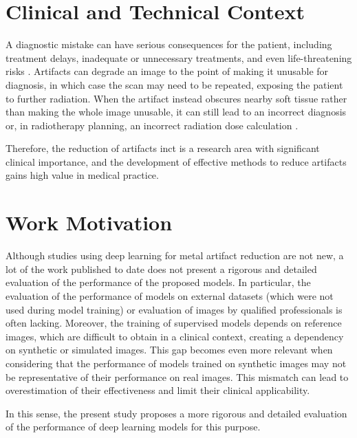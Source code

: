 \section{Clinical and Technical Context}

A diagnostic mistake can have serious consequences for the patient, including treatment delays, inadequate or unnecessary treatments, and even life-threatening risks \cite{alkhodariEnhancingCCTAImage2025}. Artifacts can degrade an image to the point of making it unusable for diagnosis, in which case the scan may need to be repeated, exposing the patient to further radiation. When the artifact instead obscures nearby soft tissue rather than making the whole image unusable, it can still lead to an incorrect diagnosis or, in radiotherapy planning, an incorrect radiation dose calculation \cite{alzainCommonComputedTomography2021}.

Therefore, the reduction of artifacts in\acrshort{ct} is a research area with significant clinical importance, and the development of effective methods to reduce artifacts gains high value in medical practice.

\section{Work Motivation}

Although studies using deep learning for metal artifact reduction are not new, a lot of the work published to date does not present a rigorous and detailed evaluation of the performance of the proposed models. In particular, the evaluation of the performance of models on external datasets (which were not used during model training) or evaluation of images by qualified professionals is often lacking. Moreover, the training of supervised models depends on reference images, which are difficult to obtain in a clinical context, creating a dependency on synthetic or simulated images. This gap becomes even more relevant when considering that the performance of models trained on synthetic images may not be representative of their performance on real images. This mismatch can lead to overestimation of their effectiveness and limit their clinical applicability.

In this sense, the present study proposes a more rigorous and detailed evaluation of the performance of deep learning models for this purpose.




